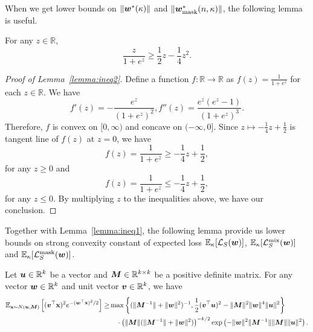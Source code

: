When we get lower bounds on $\lVert {\bm{w}}^*(\kappa) \rVert$ and $\lVert {\bm{w}}^*_\mathrm{mask}(n,\kappa) \rVert$, the following lemma is useful.
\begin{lemma} \label{lemma:ineq2}
For any $z \in \mathbb{R}$,
\begin{equation*}
    \frac{z}{1+e^z} \geq \frac{1}{2} z - \frac{1}{4}z^2.
\end{equation*}
\end{lemma}
\begin{proof}[Proof of Lemma~\ref{lemma:ineq2}]
Define a function $f: \mathbb{R} \rightarrow \mathbb{R}$ as $f(z) = \frac{1}{1+e^z}$ for each $z \in \mathbb{R}$. We have
\begin{equation*}
f'(z) = -\frac{e^z}{(1+e^z)^2}, f''(z) = \frac{e^z (e^z-1)}{(1+e^z)^3}.
\end{equation*}
Therefore, $f$ is convex on $[0, \infty)$ and concave on $(-\infty, 0]$. Since $z \mapsto -\frac{1}{4}z + \frac{1}{2}$ is tangent line of $f(z)$ at $z=0$, we have
\begin{equation*}
f(z) = \frac{1}{1+e^z} \geq -\frac{1}{4}z + \frac{1}{2},
\end{equation*}
for any $z \geq 0$ and
\begin{equation*}
f(z) = \frac{1}{1+e^z} \leq -\frac{1}{4}z + \frac{1}{2},
\end{equation*}
for any $z \leq 0$. By multiplying $z$ to the inequalities above, we have our conclusion.
\end{proof}
Together with Lemma~\ref{lemma:ineq1}, the following lemma provide us lower bounds on strong convexity constant of expected loss $\mathbb{E}_\kappa [\mathcal{L}_S ({\bm{w}})]$, $\mathbb{E}_\kappa [\mathcal{L}_S^\mathrm{mix} ({\bm{w}})]$ and $\mathbb{E}_\kappa [\mathcal{L}_S^\mathrm{mask} ({\bm{w}})]$.  
\begin{lemma} \label{lemma:ineq3}
Let ${\bm{u}} \in \mathbb{R}^k$ be a vector and ${\bm{M}} \in \mathbb{R}^{k\times k}$ be a positive definite matrix. For any vector ${\bm{w}} \in \mathbb{R}^k$ and unit vector ${\bm{v}} \in \mathbb{R}^k$, we have
\begin{align*}
\mathbb{E}_{{\mathbf{x}} \sim N({\bm{u}},{\bm{M}})}\left [({\bm{v}}^\top {\mathbf{x}})^2e^{- ({\bm{w}}^\top {\mathbf{x}})^2/2} \right]
\geq &\max \left \{ (\lVert {\bm{M}}^{-1}\rVert +\lVert {\bm{w}} \rVert^2)^{-1} ,\frac{1}{2} ({\bm{v}}^\top {\bm{u}})^2 - \lVert {\bm{M}}\rVert^2 \lVert {\bm{w}}\rVert^4 \lVert {\bm{u}} \rVert^2  \right \}\\
&\quad \cdot \left (\lVert {\bm{M}} \rVert (\lVert {\bm{M}}^{-1}\rVert + \lVert {\bm{w}}\rVert^2 ) \right )^{-k/2} \exp \left( -\lVert {\bm{w}} \rVert^2 \lVert {\bm{M}}^{-1} \rVert \lVert {\bm{M}} \rVert \lVert {\bm{u}}\rVert^2\right).
\end{align*}
\end{lemma}
